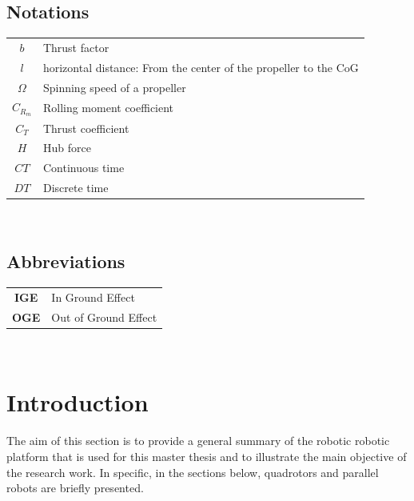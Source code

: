 \documentclass{thesisreport}
\begin{document}
 
 \newpage
 
 
 \section*{Notations}
 \begin{tabular}{cp{}}
  $b$ & Thrust factor \\
  $l$ & horizontal distance: From the center of the propeller to the CoG \\
  $\Omega$ & Spinning speed of a propeller\\
  $C_{R_m}$ & Rolling moment coefficient \\
  $C_T$ & Thrust coefficient \\
  $H$ & Hub force\\
  $CT$ & Continuous time \\
  $DT$ & Discrete time \\

\end{tabular}\\
 
 
 
 \newpage
 
  \section*{Abbreviations}
 \begin{tabular}{cp{}}
  \textbf{IGE} & In Ground Effect \\
  \textbf{OGE} & Out of Ground Effect \\

\end{tabular}\\
 \newpage
 
 \listoffigures
 
\listoftables
 
 \tableofcontents
 
 
 \chapter*{Introduction}
 	The aim of this section is to provide a general summary of the robotic robotic platform that is used for this master thesis and to illustrate the main objective of the research work.
In specific, in the sections below, quadrotors and parallel robots are briefly presented.
\end{document}
